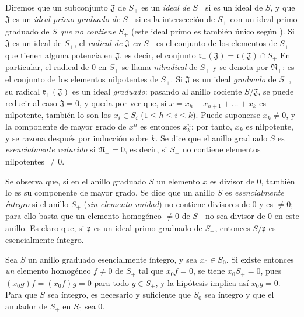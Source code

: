 \documentclass[oneside,10pt]{amsart}
\renewcommand{\leq}{\leqslant}
\let\EGAOriginalLabel\label
\renewcommand{\label}[1]{\phantomsection\EGAOriginalLabel{#1}}
\begin{document}
\begin{env}[2.1.10]
\label{II.2.1.10-fr}
Diremos que un subconjunto $\mathfrak{J}$ de $S_+$ es un \emph{ideal de $S_+$} si es un ideal de $S$, y que $\mathfrak{J}$ es un \emph{ideal primo graduado de $S_+$} si es la intersección de $S_+$ con un ideal primo graduado de $S$ \emph{que no contiene $S_+$} (este ideal primo es también único según ).
Si $\mathfrak{J}$ es un ideal de $S_+$, el \emph{radical de $\mathfrak{J}$ en $S_+$} es el conjunto de los elementos de $S_+$ que tienen alguna potencia en $\mathfrak{J}$, es decir, el conjunto
$\mathfrak{r}_+(\mathfrak{J})=\mathfrak{r}(\mathfrak{J})\cap S_+$
En particular, el radical de $0$ en $S_+$ se llama \emph{nilradical} de $S_+$ y se denota por $\mathfrak{N}_+$: es el conjunto de los elementos nilpotentes de $S_+$.
Si $\mathfrak{J}$ es un ideal \emph{graduado} de $S_+$, su radical $\mathfrak{r}_+(\mathfrak{J})$ es un ideal \emph{graduado}: pasando al anillo cociente $S/\mathfrak{J}$, se puede reducir al caso $\mathfrak{J}=0$, y queda por ver que, si $x=x_h+x_{h+1}+\ldots+x_k$ es nilpotente, también lo son los $x_i\in S_i$ ($1\leq h\leq i\leq k$).
Puede suponerse $x_k\neq 0$, y la componente de mayor grado de $x^n$ es entonces $x_k^n$; por tanto, $x_k$ es nilpotente, y se razona después por inducción sobre $k$.
Se dice que el anillo graduado $S$ es \emph{esencialmente reducido} si $\mathfrak{N}_+=0$, es decir, si $S_+$ no contiene elementos nilpotentes $\neq 0$.
\end{env}

\begin{env}[2.1.11]
\label{II.2.1.11-fr}
Se observa que, si en el anillo graduado $S$ un elemento $x$ es divisor de $0$, también lo es su componente de mayor grado.
Se dice que un anillo $S$ es \emph{esencialmente íntegro} si el anillo $S_+$ (\emph{sin elemento unidad}) no contiene divisores de $0$ y es $\neq 0$; para ello basta que un elemento homogéneo $\neq 0$ de $S_+$ no sea divisor de $0$ en este anillo.
Es claro que, si $\mathfrak{p}$ es un ideal primo graduado de $S_+$, entonces $S/\mathfrak{p}$ es esencialmente íntegro.

Sea $S$ un anillo graduado esencialmente íntegro, y sea $x_0\in S_0$.
Si existe entonces \emph{un} elemento homogéneo $f\neq 0$ de $S_+$ tal que $x_0f=0$, se tiene $x_0S_+=0$, pues $(x_0g)f=(x_0f)g=0$ para todo $g\in S_+$, y la hipótesis implica así $x_0g=0$.
Para que $S$ sea íntegro, es necesario y suficiente que $S_0$ sea íntegro y que el anulador de $S_+$ en $S_0$ sea $0$.
\end{env}
\end{document}
